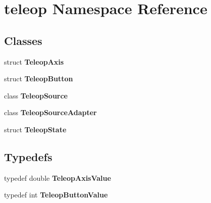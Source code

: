 \section{teleop Namespace Reference}
\label{namespaceteleop}
\subsection*{Classes}
\begin{DoxyCompactItemize}
\item 
struct {\bf TeleopAxis}
\item 
struct {\bf TeleopButton}
\item 
class {\bf TeleopSource}
\item 
class {\bf TeleopSourceAdapter}
\item 
struct {\bf TeleopState}
\end{DoxyCompactItemize}
\subsection*{Typedefs}
\begin{DoxyCompactItemize}
\item 
typedef double {\bf TeleopAxisValue}
\item 
typedef int {\bf TeleopButtonValue}
\end{DoxyCompactItemize}
